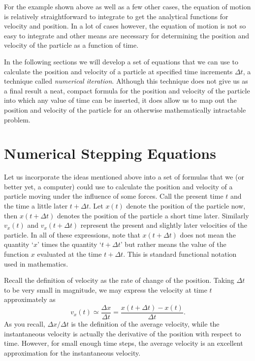 For the example shown above as well as a few other cases, the equation
of motion is relatively straightforward to integrate to get the
analytical functions for velocity and position.  In a lot of cases
however, the equation of motion is not so easy to integrate and other
means are necessary for determining the position and velocity of the
particle as a function of time.

In the following sections we will develop a set of equations that we
can use to calculate the position and velocity of a particle at
specified time increments $\Delta t$, a technique called {\em
  numerical iteration}.  Although this technique does not give us as a
final result a neat, compact formula for the position and velocity of
the particle into which any value of time can be inserted, it does
allow us to map out the position and velocity of the particle for an
otherwise mathematically intractable problem.

\section{Numerical Stepping Equations}

Let us incorporate the ideas mentioned above into a set of formulas
that we (or better yet, a computer) could use to calculate the
position and velocity of a particle moving under the influence of some
forces.  Call the present time $t$ and the time a little later $t +
\Delta t$.  Let $x(t)$ denote the position of the particle now, then
$x(t + \Delta t)$ denotes the position of the particle a short time
later.  Similarly $v_x(t)$ and $v_x(t + \Delta t)$ represent the present
and slightly later velocities of the particle.  In all of these
expressions, note that $x(t + \Delta t)$ does not mean the quantity
`$x$' times the quantity `$t + \Delta t$' but rather means the value
of the function $x$ evaluated at the time $t + \Delta t$.  This is
standard functional notation used in mathematics.

Recall the definition of velocity as the rate of change of the
position.  Taking $\Delta t$ to be very small in magnitude, we may
express the velocity at time $t$ approximately as
\begin{equation}
  v_x(t) \simeq \frac{\Delta x}{\Delta t} = \frac{x(t+\Delta t) - x(t)}
  {\Delta t}.
\end{equation}
As you recall, $\Delta x/\Delta t$ is the definition of the average
velocity, while the instantaneous velocity is actually the derivative
of the position with respect to time.  However, for small enough time
steps, the average velocity is an excellent approximation for the
instantaneous velocity.

